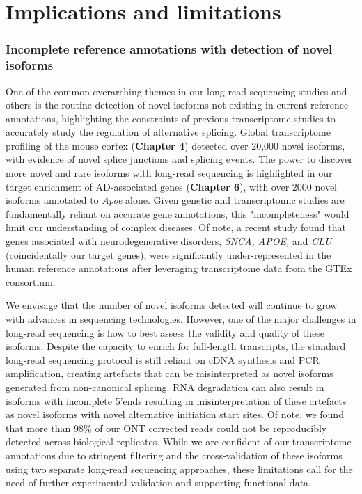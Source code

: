 \section{Implications and limitations}

\subsubsection{Incomplete reference annotations with detection of novel isoforms} 
One of the common overarching themes in our long-read sequencing studies and others is the routine detection of novel isoforms not existing in current reference annotations, highlighting the constraints of previous transcriptome studies to accurately study the regulation of alternative splicing. Global transcriptome profiling of the mouse cortex (\textbf{Chapter 4}) detected over 20,000 novel isoforms, with evidence of novel splice junctions and splicing events. The power to discover more novel and rare isoforms with long-read sequencing is highlighted in our target enrichment of AD-associated genes (\textbf{Chapter 6}), with over 2000 novel isoforms annotated to \textit{Apoe} alone. Given genetic and transcriptomic studies are fundamentally reliant on accurate gene annotations, this "incompleteness" would limit our understanding of complex diseases. Of note, a recent study found that genes associated with neurodegenerative disorders, \textit{SNCA, APOE,} and \textit{CLU} (coincidentally our target genes), were significantly under-represented in the human reference annotations after leveraging transcriptome data from the GTEx consortium.  

We envisage that the number of novel isoforms detected will continue to grow with advances in sequencing technologies. However, one of the major challenges in long-read sequencing is how to best assess the validity and quality of these isoforms. Despite the capacity to enrich for full-length transcripts, the standard long-read sequencing protocol is still reliant on cDNA synthesis and PCR amplification, creating artefacts that can be misinterpreted as novel isoforms generated from non-canonical splicing. RNA degradation can also result in isoforms with incomplete 5'ends resulting in misinterpretation of these artefacts as novel isoforms with novel alternative initiation start sites. Of note, we found that more than 98\% of our ONT corrected reads could not be reproducibly detected across biological replicates. While we are confident of our transcriptome annotations due to stringent filtering and the cross-validation of these isoforms using two separate long-read sequencing approaches, these limitations call for the need of further experimental validation and supporting functional data. 

